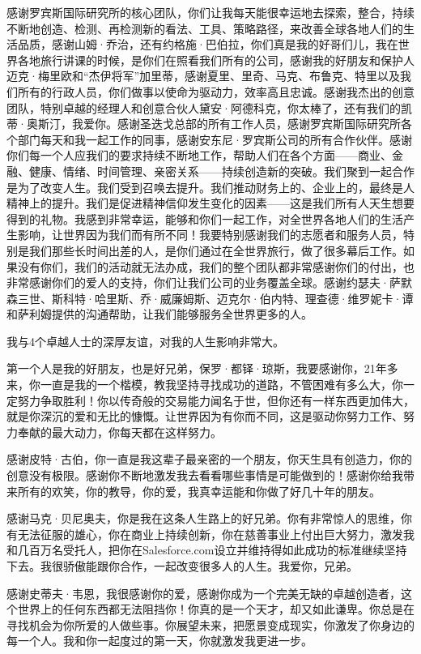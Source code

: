 感谢罗宾斯国际研究所的核心团队，你们让我每天能很幸运地去探索，整合，持续不断地创造、检测、再检测新的看法、工具、策略路径，来改善全球各地人们的生活品质，感谢山姆·乔治，还有约格施·巴伯拉，你们真是我的好哥们儿，我在世界各地旅行讲课的时候，是你们在照看我们所有的公司，感谢我的好朋友和保护人迈克·梅里欧和“杰伊将军”加里蒂，感谢夏里、里奇、马克、布鲁克、特里以及我们所有的行政人员，你们做事以使命为驱动力，效率高且忠诚。感谢我杰出的创意团队，特别卓越的经理人和创意合伙人黛安·阿德科克，你太棒了，还有我们的凯蒂·奥斯汀，我爱你。感谢圣迭戈总部的所有工作人员，感谢罗宾斯国际研究所各个部门每天和我一起工作的同事，感谢安东尼·罗宾斯公司的所有合作伙伴。感谢你们每一个人应我们的要求持续不断地工作，帮助人们在各个方面——商业、金融、健康、情绪、时间管理、亲密关系——持续创造新的突破。我们聚到一起合作是为了改变人生。我们受到召唤去提升。我们推动财务上的、企业上的，最终是人精神上的提升。我们是促进精神信仰发生变化的因素——这是我们所有人天生想要得到的礼物。我感到非常幸运，能够和你们一起工作，对全世界各地人们的生活产生影响，让世界因为我们而有所不同！我要特别感谢我们的志愿者和服务人员，特别是我们那些长时间出差的人，是你们通过在全世界旅行，做了很多幕后工作。如果没有你们，我们的活动就无法办成，我们的整个团队都非常感谢你们的付出，也非常感谢你们的爱人的支持，你们让我们公司的业务覆盖全球。感谢约瑟夫·萨默森三世、斯科特·哈里斯、乔·威廉姆斯、迈克尔·伯内特、理查德·维罗妮卡·谭和萨利姆提供的沟通帮助，让我们能够服务全世界更多的人。

我与4个卓越人士的深厚友谊，对我的人生影响非常大。

第一个人是我的好朋友，也是好兄弟，保罗·都铎·琼斯，我要感谢你，21年多来，你一直是我的一个楷模，教我坚持寻找成功的道路，不管困难有多么大，你一定努力争取胜利！你以传奇般的交易能力闻名于世，但你还有一样东西更加伟大，就是你深沉的爱和无比的慷慨。让世界因为有你而不同，这是驱动你努力工作、努力奉献的最大动力，你每天都在这样努力。

感谢皮特·古伯，你一直是我这辈子最亲密的一个朋友，你天生具有创造力，你的创意没有极限。感谢你不断地激发我去看看哪些事情是可能做到的！感谢你给我带来所有的欢笑，你的教导，你的爱，我真幸运能和你做了好几十年的朋友。

感谢马克·贝尼奥夫，你是我在这条人生路上的好兄弟。你有非常惊人的思维，你有无法征服的雄心，你在商业上持续创新，你在慈善事业上付出巨大努力，激发我和几百万名受托人，把你在Salesforce.com设立并维持得如此成功的标准继续坚持下去。我很骄傲能跟你合作，一起改变很多人的人生。我爱你，兄弟。

感谢史蒂夫·韦恩，我很感谢你的爱，感谢你成为一个完美无缺的卓越创造者，这个世界上的任何东西都无法阻挡你！你真的是一个天才，却又如此谦卑。你总是在寻找机会为你所爱的人做些事。你展望未来，把愿景变成现实，你激发了你身边的每一个人。我和你一起度过的第一天，你就激发我更进一步。

